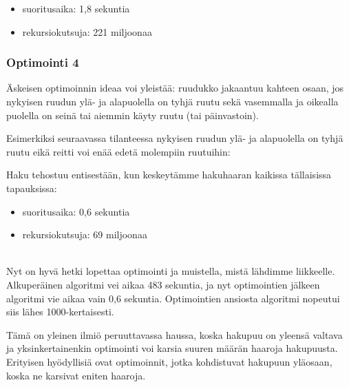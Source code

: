 \begin{itemize}
\item
suoritusaika: 1{,}8 sekuntia
\item
rekursiokutsuja: 221 miljoonaa
\end{itemize}

\subsubsection{Optimointi 4}

Äskeisen optimoinnin ideaa voi yleistää:
ruudukko jakaantuu kahteen osaan,
jos nykyisen ruudun ylä- ja alapuolella on
tyhjä ruutu sekä vasemmalla ja oikealla
puolella on seinä tai aiemmin käyty ruutu
(tai päinvastoin).

Esimerkiksi seuraavassa tilanteessa
nykyisen ruudun ylä- ja alapuolella on
tyhjä ruutu eikä reitti voi enää edetä
molempiin ruutuihin:
\begin{center}
\end{center}
Haku tehostuu entisestään, kun keskeytämme
hakuhaaran kaikissa tällaisissa tapauksissa:

\begin{itemize}
\item
suoritusaika: 0{,}6 sekuntia
\item
rekursiokutsuja: 69 miljoonaa
\end{itemize}

~\\
Nyt on hyvä hetki lopettaa optimointi ja muistella,
mistä lähdimme liikkeelle.
Alkuperäinen algoritmi vei aikaa 483 sekuntia,
ja nyt optimointien jälkeen algoritmi vie aikaa
vain 0{,}6 sekuntia.
Optimointien ansiosta algoritmi nopeutui
siis lähes 1000-kertaisesti.

Tämä on yleinen ilmiö peruuttavassa haussa,
koska hakupuu on yleensä valtava ja
yksinkertainenkin optimointi voi karsia suuren
määrän haaroja hakupuusta.
Erityisen hyödyllisiä ovat optimoinnit,
jotka kohdistuvat hakupuun yläosaan,
koska ne karsivat eniten haaroja.

